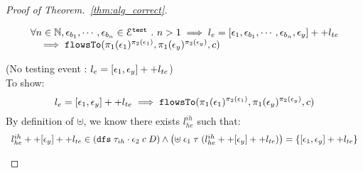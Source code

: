 \begin{proof}[Proof of Theorem.~\ref{thm:alg_correct}]
\begin{case}
\begin{subcase}
\begin{equation}
\begin{array}{l}
  \forall n \in \mathbb{N}, \mathtt{\epsilon}_{b_1}, \cdots, \mathtt{\epsilon}_{b_n} \in \mathcal{E}^{\mathtt{{test}}}~.~
   n > 1 \implies
   l_e = {[\mathtt{\epsilon}_1, \mathtt{\epsilon}_{b_1}, \cdots, \mathtt{\epsilon}_{b_n}, \mathtt{\epsilon}_y]} ++ l_{te}
   \\ \quad
  \implies \mathtt{flowsTo}(\pi_1(\mathtt{\epsilon}_1)^{\pi_2(\mathtt{\epsilon}_1)}, \pi_1(\mathtt{\epsilon}_y)^{\pi_2(\mathtt{\epsilon}_y)}, c)
\end{array}
\end{equation}
%
\begin{subsubcase}(No testing event : $l_e = [\mathtt{\epsilon}_1, \mathtt{\epsilon}_y] ++ l_{te}$)
\\
To show:
\[  
  l_e = [\mathtt{\epsilon}_1, \mathtt{\epsilon}_y] ++ l_{te}
  \implies
\mathtt{flowsTo}(\pi_1(\mathtt{\epsilon}_1)^{\pi_2(\mathtt{\epsilon}_1)}, \pi_1(\mathtt{\epsilon}_y)^{\pi_2(\mathtt{\epsilon}_y)}, c)
\]
By definition of $\uplus$, we know there exists $l^{ih}_{he}$ such that:
\[
\begin{array}{l}
  l^{ih}_{he} ++ [\event_y] ++ l_{te} \in (\kw{dfs} \eapp {\trace_{ih} \cdot \event_2} \eapp c \eapp D )
  \land
  \left(\uplus \eapp \event_1 \eapp \trace \eapp ( l^{ih}_{he} ++ [\event_y] ++ l_{te}) \right) 
  = \{[\event_1, \event_y] ++ l_{te}\}
\end{array}
\]

\end{subsubcase}
\end{subcase}
\end{case}
\end{proof}
